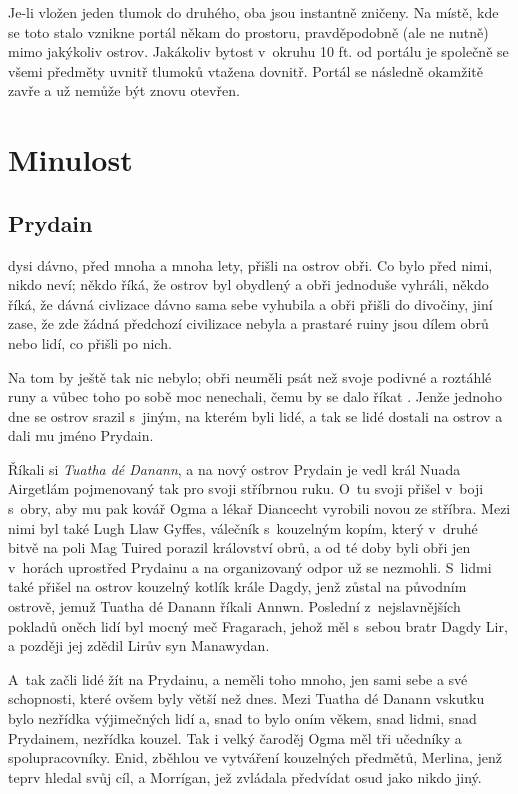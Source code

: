 \documentclass[a4paper,twocolumn,openany,nodeprecatedcode, justified]{dndbook}
\begin{document}
	Je-li vložen jeden tlumok do druhého, oba jsou instantně zničeny. Na místě, kde se toto stalo vznikne portál někam do prostoru, pravděpodobně (ale ne nutně) mimo jakýkoliv ostrov. Jakákoliv bytost v~okruhu 10 ft. od portálu je společně se všemi předměty uvnitř tlumoků vtažena dovnitř. Portál se následně okamžitě zavře a už nemůže být znovu otevřen.
	

	
	
	
	\part{Minulost}
	
	\chapter{Prydain}
	
	dysi dávno, před mnoha a mnoha lety, přišli na ostrov obři. Co bylo před nimi, nikdo neví; někdo říká, že ostrov byl obydlený a obři jednoduše vyhráli, někdo říká, že dávná civlizace dávno sama sebe vyhubila a obři přišli do divočiny, jiní zase, že zde žádná předchozí civilizace nebyla a prastaré ruiny jsou dílem obrů nebo lidí, co přišli po nich.
	
	Na tom by ještě tak nic nebylo; obři neuměli psát než svoje podivné a roztáhlé runy a vůbec toho po sobě moc nenechali, čemu by se dalo říkat . Jenže jednoho dne se ostrov srazil s~jiným, na kterém byli lidé, a tak se lidé dostali na ostrov a dali mu jméno Prydain.
	
	Říkali si \emph{Tuatha dé Danann}, a na nový ostrov Prydain je vedl král Nuada Airgetlám pojmenovaný tak pro svoji stříbrnou ruku. O~tu svoji přišel v~boji s~obry, aby mu pak kovář Ogma a lékař Diancecht vyrobili novou ze stříbra. Mezi nimi byl také Lugh Llaw Gyffes, válečník s~kouzelným kopím, který v~druhé bitvě na poli Mag Tuired porazil království obrů, a od té doby byli obři jen v~horách uprostřed Prydainu a na organizovaný odpor už se nezmohli. S~lidmi také přišel na ostrov kouzelný kotlík krále Dagdy, jenž zůstal na původním ostrově, jemuž Tuatha dé Danann říkali Annwn. Poslední z~nejslavnějších pokladů oněch lidí byl mocný meč Fragarach, jehož měl s~sebou bratr Dagdy Lir, a později jej zdědil Lirův syn Manawydan.
	
	A~tak začli lidé žít na Prydainu, a neměli toho mnoho, jen sami sebe a své schopnosti, které ovšem byly větší než dnes. Mezi Tuatha dé Danann vskutku bylo nezřídka výjimečných lidí a, snad to bylo oním věkem, snad lidmi, snad Prydainem, nezřídka kouzel. Tak i velký čaroděj Ogma měl tři učedníky a spolupracovníky. Enid, zběhlou ve vytváření kouzelných předmětů, Merlina, jenž teprv hledal svůj cíl, a Morrígan, jež zvládala předvídat osud jako nikdo jiný.
	
\end{document}
